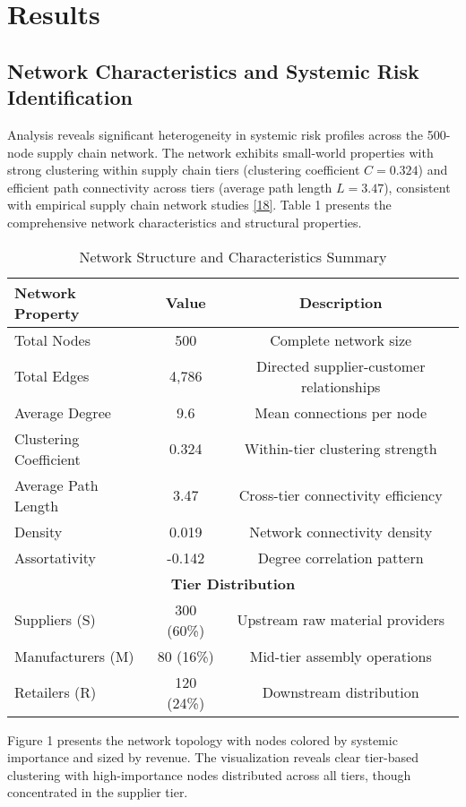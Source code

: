 \documentclass[a4 paper, 11pt,twoside]{article}
\newcommand{\0}{\Bf{0}}
\theoremstyle{definition}
\begin{document}
\section{Results}

\subsection{Network Characteristics and Systemic Risk Identification}

Analysis reveals significant heterogeneity in systemic risk profiles across the 500-node supply chain network. The network exhibits small-world properties with strong clustering within supply chain tiers (clustering coefficient $C = 0.324$) and efficient path connectivity across tiers (average path length $L = 3.47$), consistent with empirical supply chain network studies \hyperref[ref18]{[18]}. Table 1 presents the comprehensive network characteristics and structural properties.

\begin{table}[H]
\centering
\caption{Network Structure and Characteristics Summary}
\begin{tabular}{@{}lcc@{}}
\toprule
\textbf{Network Property} & \textbf{Value} & \textbf{Description} \\
\midrule
Total Nodes & 500 & Complete network size \\
Total Edges & 4,786 & Directed supplier-customer relationships \\
Average Degree & 9.6 & Mean connections per node \\
Clustering Coefficient & 0.324 & Within-tier clustering strength \\
Average Path Length & 3.47 & Cross-tier connectivity efficiency \\
Density & 0.019 & Network connectivity density \\
Assortativity & -0.142 & Degree correlation pattern \\
\midrule
\multicolumn{3}{c}{\textbf{Tier Distribution}} \\
\midrule
Suppliers (S) & 300 (60\%) & Upstream raw material providers \\
Manufacturers (M) & 80 (16\%) & Mid-tier assembly operations \\
Retailers (R) & 120 (24\%) & Downstream distribution \\
\bottomrule
\end{tabular}
\end{table}

Figure 1 presents the network topology with nodes colored by systemic importance and sized by revenue. The visualization reveals clear tier-based clustering with high-importance nodes distributed across all tiers, though concentrated in the supplier tier.
\end{document}
